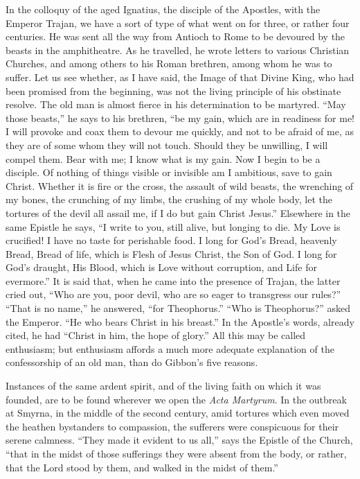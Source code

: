 In the colloquy of the aged Ignatius, the disciple of the Apostles,
with the Emperor Trajan, we have a sort of type of what went on for
three, or rather four centuries. He was sent all the way from Antioch
to Rome to be devoured by the beasts in the amphitheatre. As he
travelled, he wrote letters to various Christian Churches, and
among others to his Roman brethren, among whom he was to suffer. Let
us see whether, as I have said, the Image of that Divine King, who had
been promised from the beginning, was not the living principle of his
obstinate resolve. The old man is almost fierce in his determination
to be martyred. ``May those beasts,'' he says to his brethren,
``be my gain, which are in readiness for me! I will provoke and
coax them to devour me quickly, and not to be afraid of me, as they
are of some whom they will not touch. Should they be unwilling, I will
compel them. Bear with me; I know what is my gain. Now I begin to be a
disciple. Of nothing of things visible or invisible am I ambitious,
save to gain Christ. Whether it is fire or the cross, the assault of
wild beasts, the wrenching of my bones, the crunching of my limbs, the
crushing of my whole body, let the tortures of the devil all assail
me, if I do but gain Christ Jesus.'' Elsewhere in the same Epistle
he says, ``I write to you, still alive, but longing to die. My
Love is crucified! I have no taste for perishable food. I long for God's
Bread, heavenly Bread, Bread of life, which is Flesh of Jesus Christ,
the Son of God. I long for God's draught, His Blood, which is Love
without corruption, and Life for evermore.'' It is said that, when
he came into the presence of Trajan, the latter cried out, ``Who
are you, poor devil, who are so eager to transgress our rules?''
``That is no name,'' he answered, ``for Theophorus.''
``Who is Theophorus?'' asked the Emperor. ``He who bears
Christ in his breast.'' In the Apostle's words, already cited, he
had ``Christ in him, the hope of glory.'' All this may
be called enthusiasm; but enthusiasm affords a much more adequate
explanation of the confessorship of an old man, than do Gibbon's five
reasons.

Instances of the same ardent spirit, and of the living faith on
which it was founded, are to be found wherever we open the \emph{Acta
Martyrum}. In the outbreak at Smyrna, in the middle of the second
century, amid tortures which even moved the heathen bystanders to
compassion, the sufferers were conspicuous for their serene calmness.
``They made it evident to us all,'' says the Epistle of the
Church, ``that in the midst of those sufferings they were absent
from the body, or rather, that the Lord stood by them, and walked in
the midst of them.''

